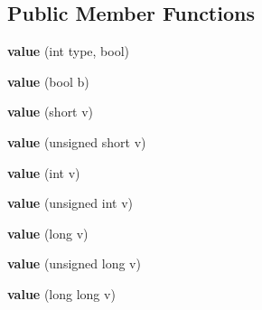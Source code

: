 \subsection*{Public Member Functions}
\begin{DoxyCompactItemize}
\item 
{\bfseries value} (int type, bool)\hypertarget{classpangolin_1_1json_1_1value_a5eacf26a4b7f8099366e19f2cb0f64a5}{}\label{classpangolin_1_1json_1_1value_a5eacf26a4b7f8099366e19f2cb0f64a5}

\item 
{\bfseries value} (bool b)\hypertarget{classpangolin_1_1json_1_1value_a372c0bb1d79a7b8e6312899debc1245d}{}\label{classpangolin_1_1json_1_1value_a372c0bb1d79a7b8e6312899debc1245d}

\item 
{\bfseries value} (short v)\hypertarget{classpangolin_1_1json_1_1value_a53c8eefb0df4964a4f5d765f191a2956}{}\label{classpangolin_1_1json_1_1value_a53c8eefb0df4964a4f5d765f191a2956}

\item 
{\bfseries value} (unsigned short v)\hypertarget{classpangolin_1_1json_1_1value_a8aa58b0259f8971e04ff6eab35d28591}{}\label{classpangolin_1_1json_1_1value_a8aa58b0259f8971e04ff6eab35d28591}

\item 
{\bfseries value} (int v)\hypertarget{classpangolin_1_1json_1_1value_a2883830cd70040c8abe199ecd2709a5b}{}\label{classpangolin_1_1json_1_1value_a2883830cd70040c8abe199ecd2709a5b}

\item 
{\bfseries value} (unsigned int v)\hypertarget{classpangolin_1_1json_1_1value_aeb0adaa5ffc03f176aac712c75020824}{}\label{classpangolin_1_1json_1_1value_aeb0adaa5ffc03f176aac712c75020824}

\item 
{\bfseries value} (long v)\hypertarget{classpangolin_1_1json_1_1value_a3ae20b7008a89a960e79781a1eb5fe28}{}\label{classpangolin_1_1json_1_1value_a3ae20b7008a89a960e79781a1eb5fe28}

\item 
{\bfseries value} (unsigned long v)\hypertarget{classpangolin_1_1json_1_1value_a2c89b26dc42112c0e17af8fdbc64edce}{}\label{classpangolin_1_1json_1_1value_a2c89b26dc42112c0e17af8fdbc64edce}

\item 
{\bfseries value} (long long v)\hypertarget{classpangolin_1_1json_1_1value_a962207e830534cc31bbba245d99e67c8}{}\label{classpangolin_1_1json_1_1value_a962207e830534cc31bbba245d99e67c8}


\end{DoxyCompactItemize}
